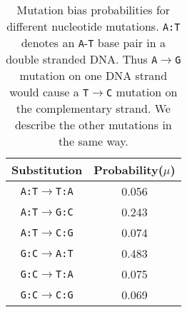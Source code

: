\documentclass[12pt,a4paper]{article}
\begin{document}
\begin{table}[H]
\centering
\begin{tabular}{c c}
\toprule
\textbf{Substitution} & Probability($\mu$) \\\midrule
\texttt{A:T}$\to$\texttt{T:A} & 0.056 \\\midrule
\texttt{A:T}$\to$\texttt{G:C} & 0.243 \\\midrule
\texttt{A:T}$\to$\texttt{C:G} & 0.074 \\\midrule
\texttt{G:C}$\to$\texttt{A:T} & 0.483 \\\midrule
\texttt{G:C}$\to$\texttt{T:A} & 0.075 \\\midrule
\texttt{G:C}$\to$\texttt{C:G} & 0.069 \\\bottomrule
\end{tabular}
\caption{Mutation bias probabilities for different nucleotide mutations. \texttt{A:T} denotes an \texttt{A}-\texttt{T} base pair in a double stranded DNA. Thus \texttt{A}$\to$\texttt{G} mutation on one DNA strand would cause a \texttt{T}$\to$\texttt{C} mutation on the complementary strand. We describe the other mutations in the same way.}
\label{mutbias}
\end{table}
\end{document}
